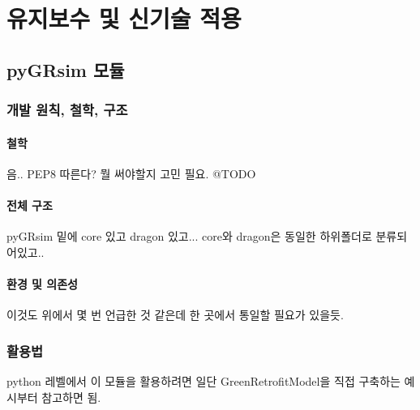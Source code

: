 \part{유지보수 및 신기술 적용}
\label{part:module}


\chapter{pyGRsim 모듈}

\section{개발 원칙, 철학, 구조}

\subsection{철학}
음.. PEP8 따른다? 뭘 써야할지 고민 필요. @TODO

\subsection{전체 구조}
pyGRsim 밑에 core 있고 dragon 있고... core와 dragon은 동일한 하위폴더로 분류되어있고..

\subsection{환경 및 의존성}
이것도 위에서 몇 번 언급한 것 같은데 한 곳에서 통일할 필요가 있을듯.



\section{활용법}
python 레벨에서 이 모듈을 활용하려면 일단 GreenRetrofitModel을 직접 구축하는 예시부터 참고하면 됨.



